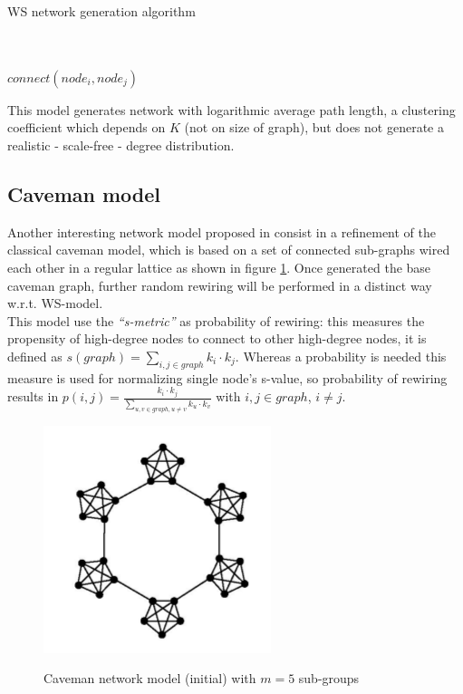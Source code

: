 \begin{algorithm}
\caption{WS network generation algorithm}
\label{sn_ws_alg}
\begin{algorithmic}
\STATE
{}\\
\\
	 		\STATE $connect(node_{i},node_{j})$
 		\ENDIF
 	\ENDFOR
\ENDFOR
\end{algorithmic}
\end{algorithm}

This model generates network with logarithmic average path length, a clustering coefficient which depends on $K$ (not on size of graph), but does not generate a realistic - scale-free - degree distribution.

\subsection{Caveman model}
\label{sn_caveman_model}
Another interesting network model proposed in\cite{4149781} consist in a refinement of the classical caveman model, which is based on a set of connected sub-graphs wired each other in a regular lattice as shown in figure \ref{fig:caveman}. Once generated the base caveman graph, further random rewiring will be performed in a distinct way w.r.t. WS-model.\\
This model use the \emph{``s-metric''} as probability of rewiring: this measures the propensity of high-degree nodes to connect to other high-degree nodes, it is defined as $s(graph)=\sum_{i,j \in graph}{k_{i} \cdot k_{j}} $. Whereas a probability is needed this measure is used for normalizing single node's s-value, so probability of rewiring results in $p(i,j) =\frac{k_{i} \cdot k_{j}}{\sum_{u,v \in graph, u \neq v}{k_{u} \cdot k_{v}}}$ with $i,j \in graph$, $i \neq j$.\\

\begin{figure}[h!]
	\begin{center}
    \label{fig:caveman}
    \includegraphics[scale=0.5]{img/caveman.png}
    \caption{Caveman network model (initial) with $m=5$ sub-groups}
  \end{center}
\end{figure}

